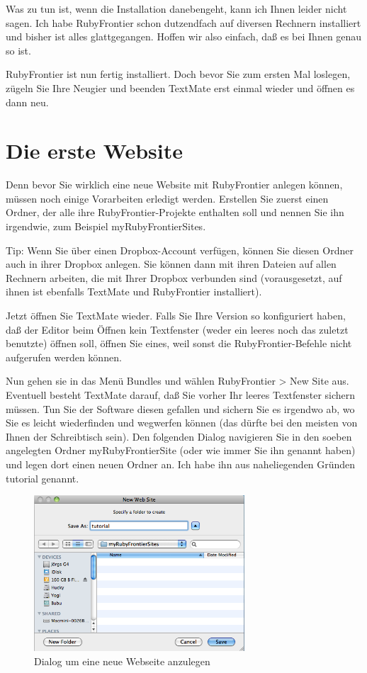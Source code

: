 \documentclass[11pt]{report}
\begin{document}
Was zu tun ist, wenn die Installation danebengeht, kann ich Ihnen leider nicht sagen. Ich habe RubyFrontier schon dutzendfach auf diversen Rechnern installiert und bisher ist alles glattgegangen. Hoffen wir also einfach, daß es bei Ihnen genau so ist.

RubyFrontier ist nun fertig installiert. Doch bevor Sie zum ersten Mal loslegen, zügeln Sie Ihre Neugier und beenden TextMate erst einmal wieder und öffnen es dann neu.
\section{Die erste Website}
\label{sec-1-2-2}


Denn bevor Sie wirklich eine neue Website mit RubyFrontier anlegen
können, müssen noch einige Vorarbeiten erledigt werden. Erstellen Sie
zuerst einen Ordner, der alle ihre RubyFrontier-Projekte enthalten
soll und nennen Sie ihn irgendwie, zum Beispiel myRubyFrontierSites.


Tip: Wenn Sie über einen Dropbox-Account verfügen, können Sie diesen
Ordner auch in ihrer Dropbox anlegen. Sie können dann mit ihren
Dateien auf allen Rechnern arbeiten, die mit Ihrer Dropbox verbunden
sind (vorausgesetzt, auf ihnen ist ebenfalls TextMate und RubyFrontier
installiert).


Jetzt öffnen Sie TextMate wieder. Falls Sie Ihre Version so
konfiguriert haben, daß der Editor beim Öffnen kein Textfenster (weder
ein leeres noch das zuletzt benutzte) öffnen soll, öffnen Sie eines,
weil sonst die RubyFrontier-Befehle nicht aufgerufen werden können.


Nun gehen sie in das Menü Bundles und wählen RubyFrontier > New Site
aus. Eventuell besteht TextMate darauf, daß Sie vorher Ihr leeres
Textfenster sichern müssen. Tun Sie der Software diesen gefallen und
sichern Sie es irgendwo ab, wo Sie es leicht wiederfinden und
wegwerfen können (das dürfte bei den meisten von Ihnen der
Schreibtisch sein). Den folgenden Dialog navigieren Sie in den soeben
angelegten Ordner myRubyFrontierSite (oder wie immer Sie ihn genannt
haben) und legen dort einen neuen Ordner an. Ich habe ihn aus
naheliegenden Gründen tutorial genannt.

\begin{figure}[h!]
\centering
\includegraphics[width=0.7\textwidth]{./images/neuer-source-folder.png}
\caption{\label{neuer-source-folder}Dialog um eine neue Webseite anzulegen}
\end{figure}
\end{document}
